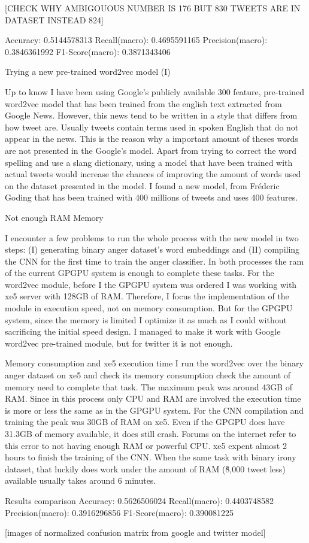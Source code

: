 [CHECK WHY AMBIGOUOUS NUMBER IS 176 BUT 830 TWEETS ARE IN DATASET INSTEAD 824]

Accuracy: 0.5144578313
Recall(macro): 0.4695591165
Precision(macro): 0.3846361992
F1-Score(macro): 0.3871343406

Trying a new pre-trained word2vec model (I)

Up to know I have been using Google’s publicly available 300 feature, pre-trained word2vec model that has been trained from the english text extracted from Google News.
However, this news tend to be written in a style that differs from how tweet are. Usually tweets contain terms used in spoken English that do not appear in the news. This is the reason why a important amount of theses words are not presented in the Google’s model. Apart from trying to correct the word spelling and use a slang dictionary, using a model that have been trained with actual tweets would increase the chances of improving the amount of words used on the dataset presented in the model.
I found a new model, from Fréderic Goding\cite{godin2015multimedia} that has been trained with 400 millions of tweets and uses 400 features.

Not enough RAM Memory

I encounter a few problems to run the whole process with the new model in two steps: (I) generating binary anger dataset’s word embeddings and (II) compiling the CNN for the first time to train the anger classifier. In both processes the ram of the current GPGPU system is enough to complete these tasks. 
For the word2vec module, before I the GPGPU system was ordered I was working with xe5 server with 128GB of RAM. Therefore, I focus the implementation of the module in execution speed, not on memory consumption. But for the GPGPU system, since the memory is limited I optimize it as much as I could without sacrificing the initial speed design. I managed to make it work with Google word2vec pre-trained module, but for twitter it is not enough.

Memory consumption and xe5 execution time
I run the word2vec over the binary anger dataset on xe5 and check its memory consumption check the amount of memory need to complete that task. The maximum peak was around 43GB of RAM. Since in this process only CPU and RAM are involved the execution time is more or less the same as in the GPGPU system.
For the CNN compilation and training the peak was 30GB of RAM on xe5. Even if the GPGPU does have 31.3GB of memory available, it does still crash. Forums on the internet refer to this error to not having enough RAM or powerful CPU. xe5 expent almost 2 hours to finish the training of the CNN. When the same task with binary irony dataset, that luckily does work under the amount of RAM (\~8,000 tweet less) available usually takes around 6 minutes.

Results comparison
Accuracy: 0.5626506024
Recall(macro): 0.4403748582
Precision(macro): 0.3916296856
F1-Score(macro): 0.390081225

[images of normalized confusion matrix from google and twitter model]